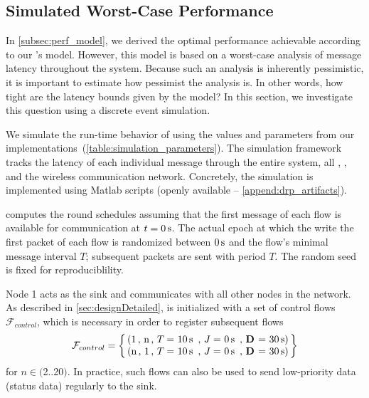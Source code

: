

\subsection{Simulated Worst-Case Performance}
\label{subsec:simulation}

In \cref{subsec:perf_model}, we derived the optimal performance achievable according to our \DRP's model.
However, this model is based on a worst-case analysis of message latency throughout the system.
Because such an analysis is inherently pessimistic, it is important to estimate how pessimist the analysis is. In other words, how tight are the latency bounds given by the model?
In this section, we investigate this question using a discrete event simulation.

We simulate the run-time behavior of \DRP using the values and parameters from our implementations~(\cref{table:simulation_parameters}).
The simulation framework tracks the latency of each individual message through the entire system, \ie all \APs, \CPs, \bolt and the wireless communication network.
Concretely, the simulation is implemented using Matlab scripts (openly available -- \cref{append:drp_artifacts}).

\blink computes the round schedules assuming that the first message of each flow is available for communication at $t = 0\,\text{s}$. The actual epoch at which the  \APs write the first packet of each flow is randomized between $0\,\text{s}$ and the flow's minimal message interval $T$; subsequent packets are sent with period $T$.
The random seed is fixed for reproduciblility.

Node 1 acts as the sink and communicates with all other nodes in the network. As described in \cref{sec:designDetailed}, \DRP is initialized with a set of control flows $\mathcal{F}_{control}$, which is necessary in order to register subsequent flows
\[
\mathcal{F}_{control} =
	\left\lbrace
	\begin{tabular}{@{\,}l@{\,}}
	(1\,, n\,, \periodany = 10\s\,, \jitterany = 0\s\,, \deadlineany = 30\s )\\
	(n\,, 1\,, \periodany = 10\s\,, \jitterany = 0\s\,, \deadlineany = 30\s )\\
	\end{tabular}
	\right\rbrace
\]
for $n \in ($2$ .. $20$)$. In practice, such flows can also be used to send low-priority data (\eg status data) regularly to the sink.

